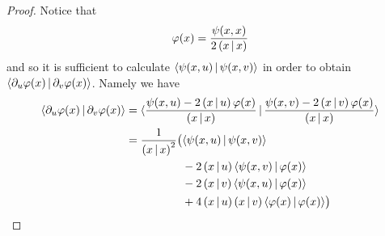 \begin{proof}

Notice that 
\[
\varphi(x) = \frac{\psi(x,x)}{2\left( x \,|\, x \right)}
\]
and so it is sufficient to calculate $\langle \psi(x,u)\,|\, \psi(x,v) \rangle$ in order to obtain $\langle \partial_u \varphi(x)\,|\, \partial_v \varphi(x) \rangle$. Namely we have
\begin{equation}\label{eq:jscal2}
\begin{aligned}
\langle \partial_u \varphi(x)\,|\, \partial_v \varphi(x) \rangle 
		& = \langle \frac{\psi(x,u) - 2\left( x \,|\, u \right)\varphi(x)}{\left( x \,|\, x \right)}\,|\, \frac{\psi(x,v) - 2\left( x \,|\, v \right)\varphi(x)}{\left( x \,|\, x \right)} \rangle \\
        & = \frac{1}{\left( x \,|\, x \right)^2} \bigl( \langle \psi(x,u)\,|\, \psi(x,v) \rangle \\
		& \qquad \qquad \quad - 2\left( x \,|\, u \right)\langle \psi(x,v)\,|\, \varphi(x) \rangle\\ 
        & \qquad \qquad \quad - 2\left( x \,|\, v \right)\langle \psi(x,u)\,|\, \varphi(x) \rangle \\
		& \qquad \qquad \quad +  4\left( x \,|\, u \right)\left( x \,|\, v \right)\langle \varphi(x)\,|\, \varphi(x) \rangle \bigr) \\
\end{aligned}
\end{equation}


\end{proof}
